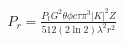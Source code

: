 \documentclass[preview]{standalone}
\begin{document}
\begin{align*}
P_r = \frac{P_t G^2 \theta \phi c \tau \pi^3 \lvert K \rvert^2 Z}{512 (2 \ln{2}) \lambda^2 r^2}
\end{align*}
\end{document}
